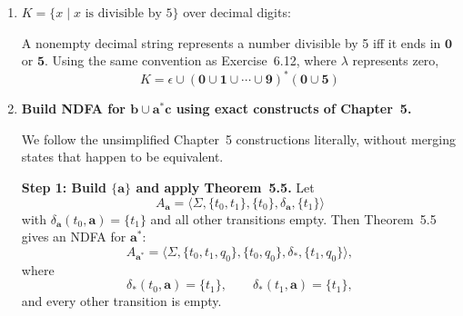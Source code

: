 \begin{enumerate}[{6.}1.]
A number is divisible by 3 iff the sum of its digits is divisible by 3.  Let
\[
D_0=(\pmb{0}\cup\pmb{3}\cup\pmb{6}\cup\pmb{9}),\quad
D_1=(\pmb{1}\cup\pmb{4}\cup\pmb{7}),\quad
D_2=(\pmb{2}\cup\pmb{5}\cup\pmb{8}).
\]
Using the $3$-state DFA that tracks the running digit sum modulo $3$, the
terminal-set equations are
\begin{align*}
  X_0 &= \epsilon \cup D_0X_0 \cup D_1X_1 \cup D_2X_2 \\
  X_1 &= D_2X_0 \cup D_0X_1 \cup D_1X_2 \\
  X_2 &= D_1X_0 \cup D_2X_1 \cup D_0X_2 .
\end{align*}
Applying Theorems~6.2 and~6.1 yields the following exact regular expression for
the language:
\[
\begin{aligned}
X_0={}&((D_0)^*\cup(D_0)^*D_1((D_0\cup D_2(D_0)^*D_1))^*D_2(D_0)^*) \\
&{}\cup((D_0)^*D_2\cup(D_0)^*D_1((D_0\cup D_2(D_0)^*D_1))^*(D_1\cup D_2(D_0)^*D_2)) \\
&\qquad\cdot(((D_0\cup D_1(D_0)^*D_2)\cup(D_2\cup D_1(D_0)^*D_1)((D_0\cup D_2(D_0)^*D_1))^*(D_1\cup D_2(D_0)^*D_2)))^* \\
&\qquad\cdot(D_1(D_0)^*\cup(D_2\cup D_1(D_0)^*D_1)((D_0\cup D_2(D_0)^*D_1))^*D_2(D_0)^*)) .
\end{aligned}
\]

\item $K=\{x\mid x\text{ is divisible by }5\}$ over decimal digits:

A nonempty decimal string represents a number divisible by 5 iff it ends in
$\pmb{0}$ or $\pmb{5}$.  Using the same convention as Exercise~6.12, where
$\lambda$ represents zero,
\[
  K = \epsilon\cup(\pmb{0}\cup\pmb{1}\cup\cdots\cup\pmb{9})^*(\pmb{0}\cup\pmb{5})
\]

\item \textbf{Build NDFA for $\pmb{b}\cup\pmb{a}^*\pmb{c}$ using exact constructs of Chapter~5.}

We follow the unsimplified Chapter~5 constructions literally, without merging
states that happen to be equivalent.

\medskip
\noindent\textbf{Step 1: Build $\{\pmb{a}\}$ and apply Theorem~5.5.}
Let
\[
A_{\pmb{a}}=\langle\Sigma,\{t_0,t_1\},\{t_0\},\delta_{\pmb{a}},\{t_1\}\rangle
\]
with $\delta_{\pmb{a}}(t_0,\pmb{a})=\{t_1\}$ and all other transitions empty.
Then Theorem~5.5 gives an NDFA for $\pmb{a}^*$:
\[
A_{\pmb{a}^*}=\langle\Sigma,\{t_0,t_1,q_0\},\{t_0,q_0\},\delta_*,\{t_1,q_0\}\rangle,
\]
where
\[
\delta_*(t_0,\pmb{a})=\{t_1\},\qquad
\delta_*(t_1,\pmb{a})=\{t_1\},
\]
and every other transition is empty.


\end{enumerate}
